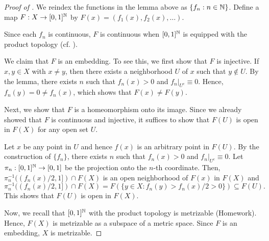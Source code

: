 \begin{proof}[Proof of ]
    We reindex the functions in the lemma above as $\{f_n:n\in\mathbb{N}\}$. Define a map $F:X\to [0,1]^{\mathbb{N}}$ by $F(x)=(f_1(x),f_2(x),\ldots)$.

    Since each $f_n$ is continuous, $F$ is continuous when $[0,1]^{\mathbb{N}}$ is equipped with the product topology (cf. ).

    We claim that $F$ is an embedding. To see this, we first show that $F$ is injective. If $x,y\in X$ with $x\neq y$, then there exists a neighborhood $U$ of $x$ such that $y\notin U$. By the lemma, there exists $n$ such that $f_n(x)>0$ and $f_n|_{U^c}\equiv 0$. Hence, $f_n(y)=0\neq f_n(x)$, which shows that $F(x)\neq F(y)$.

    Next, we show that $F$ is a homeomorphism onto its image. Since we already showed that $F$ is continuous and injective, it suffices to show that $F(U)$ is open in $F(X)$ for any open set $U$.

    Let $x$ be any point in $U$ and hence $f(x)$ is an arbitrary point in $F(U)$. By the construction of $\{f_n\}$, there exists $n$ such that $f_n(x)>0$ and $f_n|_{U^c}\equiv 0$. Let $\pi_n:[0,1]^{\mathbb{N}}\to[0,1]$ be the projection onto the $n$-th coordinate. Then, $\pi_n^{-1}((f_n(x)/2,1])\cap F(X)$ is an open neighborhood of $F(x)$ in $F(X)$ and
    \[\pi_n^{-1}((f_n(x)/2,1])\cap F(X)=F(\{y\in X:f_n(y)>f_n(x)/2>0\})\subseteq F(U).\]
    This shows that $F(U)$ is open in $F(X)$.

    Now, we recall that $[0,1]^{\mathbb{N}}$ with the product topology is metrizable (Homework). Hence, $F(X)$ is metrizable as a subspace of a metric space. Since $F$ is an embedding, $X$ is metrizable.
\end{proof}




\newpage

